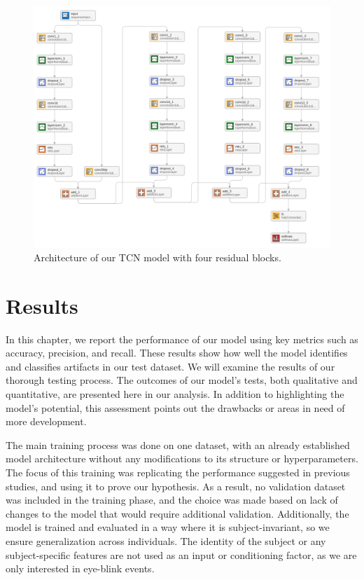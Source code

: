 \documentclass[12pt,a4paper,titlepage,openany]{report}
\begin{document}
\begin{figure}[H]
    \centering
    \includegraphics[width=1\linewidth]{images/Chapter3_Methodology/tcn-model.png}
    \caption{Architecture of our TCN model with four residual blocks.}
    \label{fig:tcn-model}
\end{figure}


\chapter{Results}
\thispagestyle{fancy}

In this chapter, we report the performance of our model using key metrics such as accuracy, precision, and recall. These results show how well the model identifies and classifies artifacts in our test dataset.
We will examine the results of our thorough testing process. The outcomes of our model's tests, both qualitative and quantitative, are presented here in our analysis. In addition to highlighting the model's potential, this assessment points out the drawbacks or areas in need of more development.

The main training process was done on one dataset, with an already established model architecture without any modifications to its structure or hyperparameters. The focus of this training was replicating the performance suggested in previous studies, and using it to prove our hypothesis. As a result, no validation dataset was included in the training phase, and the choice was made based on lack of changes to the model that would require additional validation. 
Additionally, the model is trained and evaluated in a way where it is subject-invariant, so we ensure generalization across individuals. The identity of the subject or any subject-specific features are not used as an input or conditioning factor, as we are only interested in eye-blink events.
\end{document}
